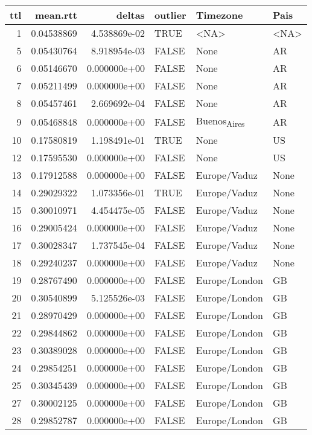 \documentclass[11pt]{article}
\author{nsm}
\date{\today}
\title{}
\begin{document}
\tableofcontents

\begin{center}
\begin{tabular}{rrrlll}
ttl & mean.rtt & deltas & outlier & Timezone & Pais\\
\hline
1 & 0.04538869 & 4.538869e-02 & TRUE & <NA> & <NA>\\
5 & 0.05430764 & 8.918954e-03 & FALSE & None & AR\\
6 & 0.05146670 & 0.000000e+00 & FALSE & None & AR\\
7 & 0.05211499 & 0.000000e+00 & FALSE & None & AR\\
8 & 0.05457461 & 2.669692e-04 & FALSE & None & AR\\
9 & 0.05468848 & 0.000000e+00 & FALSE & Buenos\textsubscript{Aires} & AR\\
10 & 0.17580819 & 1.198491e-01 & TRUE & None & US\\
12 & 0.17595530 & 0.000000e+00 & FALSE & None & US\\
13 & 0.17912588 & 0.000000e+00 & FALSE & Europe/Vaduz & None\\
14 & 0.29029322 & 1.073356e-01 & TRUE & Europe/Vaduz & None\\
15 & 0.30010971 & 4.454475e-05 & FALSE & Europe/Vaduz & None\\
16 & 0.29005424 & 0.000000e+00 & FALSE & Europe/Vaduz & None\\
17 & 0.30028347 & 1.737545e-04 & FALSE & Europe/Vaduz & None\\
18 & 0.29240237 & 0.000000e+00 & FALSE & Europe/Vaduz & None\\
19 & 0.28767490 & 0.000000e+00 & FALSE & Europe/London & GB\\
20 & 0.30540899 & 5.125526e-03 & FALSE & Europe/London & GB\\
21 & 0.28970429 & 0.000000e+00 & FALSE & Europe/London & GB\\
22 & 0.29844862 & 0.000000e+00 & FALSE & Europe/London & GB\\
23 & 0.30389028 & 0.000000e+00 & FALSE & Europe/London & GB\\
24 & 0.29854251 & 0.000000e+00 & FALSE & Europe/London & GB\\
25 & 0.30345439 & 0.000000e+00 & FALSE & Europe/London & GB\\
27 & 0.30002125 & 0.000000e+00 & FALSE & Europe/London & GB\\
28 & 0.29852787 & 0.000000e+00 & FALSE & Europe/London & GB\\
\end{tabular}
\end{center}
\end{document}
